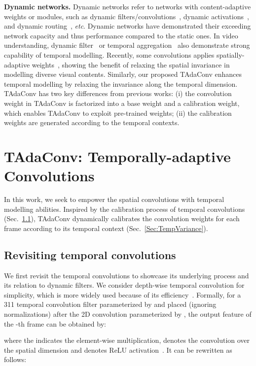 \documentclass{article} \usepackage{iclr2022_conference,times}
\def\x{}
\begin{document}
\noindent\textbf{Dynamic networks. }
Dynamic networks refer to networks with content-adaptive weights or modules, such as dynamic filters/convolutions~\citep{dynamicfilter,condconv,dcd},
dynamic activations~\citep{micronet,dynamicrelu}, and dynamic routing~\citep{skipnet,dynamicrouting}, \textit{etc}.
Dynamic networks have demonstrated their exceeding network capacity and thus performance compared to the static ones.
In video understanding, dynamic filter~\citep{tam} or temporal aggregation~\citep{adafuse} also demonstrate strong capability of temporal modelling.
Recently, some convolutions applies spatially-adaptive weights~\citep{lrlc,drconv}, showing the benefit of relaxing the spatial invariance in modelling diverse visual contents.
Similarly, our proposed TAdaConv enhances temporal modelling by relaxing the invariance along the temporal dimension.
TAdaConv has two key differences from previous works: (i) the convolution weight in TAdaConv is factorized into a base weight and a calibration weight, which enables TAdaConv to exploit pre-trained weights;
(ii) the calibration weights are generated according to the temporal contexts.

\section{TAdaConv: Temporally-adaptive Convolutions}

In this work, we seek to empower the spatial convolutions with temporal modelling abilities. 
Inspired by the calibration process of temporal convolutions (Sec.~\ref{Sec:TempConv}), TAdaConv dynamically calibrates the convolution weights for each frame according to its temporal context (Sec.~\ref{Sec:TempVariance}). 

\subsection{Revisiting temporal convolutions}
\label{Sec:TempConv}

We first revisit the temporal convolutions to showcase its underlying process and its relation to dynamic filters. 
We consider depth-wise temporal convolution for simplicity, which is more widely used because of its efficiency~\citep{tam,stm}.
Formally, for a 3\x1\x1 temporal convolution filter parameterized by  and placed (ignoring normalizations) after the 2D convolution parameterized by , the output feature  of the -th frame can be obtained by:

\noindent where the  indicates the element-wise multiplication,  denotes the convolution over the spatial dimension and  denotes ReLU activation~\citep{relu}. It can be rewritten as follows:
\end{document}

